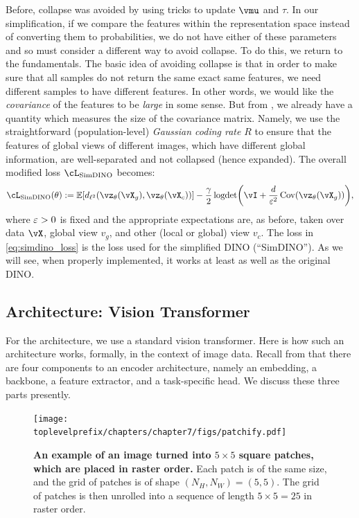 \documentclass[../../book-main.tex]{subfiles}
\begin{document}
Before, collapse was avoided by using tricks to update \(\vmu\) and \(\tau\). In our simplification, if we compare the features within the representation space instead of converting them to probabilities, we do not have either of these parameters and so must consider a different way to avoid collapse. To do this, we return to the fundamentals. The basic idea of avoiding collapse is that in order to make sure that all samples do not return the same exact same features, we need different samples to have different features. In other words, we would like the \textit{covariance} of the features to be \textit{large} in some sense. But from , we already have a quantity which measures the size of the covariance matrix. Namely, we use the straightforward (population-level) \textit{Gaussian coding rate} \(R\) to ensure that the features of global views of different images, which have different global information, are well-separated and not collapsed (hence expanded). The overall modified loss \(\cL_{\simdino}\) becomes:
\begin{equation}\label{eq:simdino_loss}
    \cL_{\simdino}(\theta) := \Ex[d_{\ell^{2}}(\vz_{\theta}(\vX_{g}), \vz_{\theta}(\vX_{c}))] - \frac{\gamma}{2}\logdet\rp{\vI + \frac{d}{\eps^{2}}\Cov(\vz_{\theta}(\vX_{g}))},
\end{equation}
where \(\varepsilon > 0\) is fixed and the appropriate expectations are, as before, taken over data \(\vX\), global view \(v_{g}\), and other (local or global) view \(v_{c}\). The loss in \eqref{eq:simdino_loss} is the loss used for the simplified DINO (``SimDINO''). As we will see, when properly implemented, it works at least as well as the original DINO.

\subsection{Architecture: Vision Transformer}\label{sub:contrastive_learning_architecture}

For the architecture, we use a standard vision transformer. Here is how such an architecture works, formally, in the context of image data. Recall from  that there are four components to an encoder architecture, namely an embedding, a backbone, a feature extractor, and a task-specific head. We discuss these three parts presently.

\begin{figure}
    \centering 
    \texttt{[image: \\toplevelprefix/chapters/chapter7/figs/patchify.pdf]}
    \caption{\small\textbf{An example of an image turned into \(5 \times 5\) square patches, which are placed in raster order.} Each patch is of the same size, and the grid of patches is of shape \((N_{H}, N_{W}) = (5, 5)\). The grid of patches is then unrolled into a sequence of length \(5 \times 5 = 25\) in raster order.}
    \label{fig:patchify_rasterize}
\end{figure}
\end{document}

